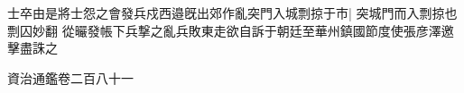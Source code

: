 士卒由是將士怨之會發兵戍西邉旣出郊作亂突門入城剽掠于市|{
	突城門而入剽掠也剽囚妙翻}
從曮發帳下兵撃之亂兵敗東走欲自訴于朝廷至華州鎮國節度使張彦澤邀擊盡誅之

資治通鑑卷二百八十一
















































































































































